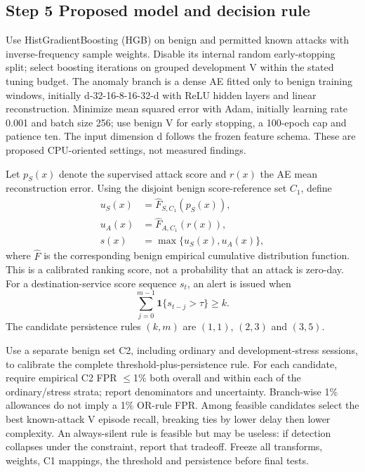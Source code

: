 \documentclass[conference]{IEEEtran}
\begin{document}
\subsection{Step 5 Proposed model and decision rule}
Use HistGradientBoosting (HGB) on benign and permitted known attacks with inverse-frequency sample weights. Disable its internal random early-stopping split; select boosting iterations on grouped development V within the stated tuning budget. The anomaly branch is a dense AE fitted only to benign training windows, initially d-32-16-8-16-32-d with ReLU hidden layers and linear reconstruction. Minimize mean squared error with Adam, initially learning rate 0.001 and batch size 256; use benign V for early stopping, a 100-epoch cap and patience ten. The input dimension d follows the frozen feature schema. These are proposed CPU-oriented settings, not measured findings.

Let $p_S(x)$ denote the supervised attack score and $r(x)$ the AE mean reconstruction error. Using the disjoint benign score-reference set $C_1$, define
\begin{align}
u_S(x)&=\widehat F_{S,C_1}\!\left(p_S(x)\right),\\
u_A(x)&=\widehat F_{A,C_1}\!\left(r(x)\right),\\
s(x)&=\max\{u_S(x),u_A(x)\},
\end{align}
where $\widehat F$ is the corresponding benign empirical cumulative distribution function. This is a calibrated ranking score, not a probability that an attack is zero-day. For a destination-service score sequence $s_t$, an alert is issued when
\begin{equation}
\sum_{j=0}^{m-1}\mathbf{1}\{s_{t-j}>\tau\}\geq k.
\end{equation}
The candidate persistence rules $(k,m)$ are $(1,1)$, $(2,3)$ and $(3,5)$.

Use a separate benign set C2, including ordinary and development-stress sessions, to calibrate the complete threshold-plus-persistence rule. For each candidate, require empirical C2 FPR $\leq$1\% both overall and within each of the ordinary/stress strata; report denominators and uncertainty. Branch-wise 1\% allowances do not imply a 1\% OR-rule FPR. Among feasible candidates select the best known-attack V episode recall, breaking ties by lower delay then lower complexity. An always-silent rule is feasible but may be useless: if detection collapses under the constraint, report that tradeoff. Freeze all transforms, weights, C1 mappings, the threshold and persistence before final tests.
\end{document}
